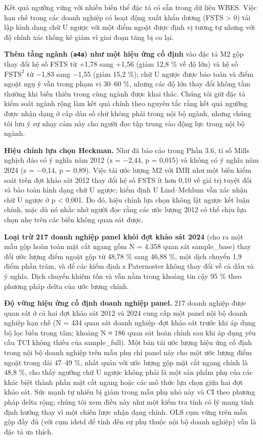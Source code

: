 \documentclass[12pt,a4paper]{article}
\begin{document}
Kết quả ngưỡng vững với nhiều biến thể đặc tả có sẵn trong dữ liệu WBES.
Việc hạn chế trong các doanh nghiệp có hoạt động xuất khẩu dương (FSTS
\textgreater{} 0) tái lập hình dạng chữ U ngược với một điểm ngoặt được
định vị tương tự nhưng với độ chính xác thống kê giảm vì giai đoạn tăng
bị co lại.

\textbf{Thêm tầng ngành (\texttt{a4a}) như một hiệu ứng cố định} vào đặc
tả M2 gộp thay đổi hệ số FSTS từ +1,78 sang +1,56 (giảm 12,8 \% về độ
lớn) và hệ số \(\mathrm{FSTS}^2\) từ −1,83 sang −1,55 (giảm 15,2 \%);
chữ U ngược được bảo toàn và điểm ngoặt ngụ ý vẫn trong phạm vi 30--60
\%, nhưng các độ lớn thay đổi không tầm thường khi biến thiên trong cùng
ngành được khai thác. Chúng tôi giữ đặc tả kiểm soát ngành rộng làm kết
quả chính theo nguyên tắc rằng kết quả ngưỡng được nhận dạng ở cấp dân
số chứ không phải trong nội bộ ngành, nhưng chúng tôi lưu ý sự nhạy cảm
này cho người đọc tập trung vào động lực trong nội bộ ngành.

\textbf{Hiệu chỉnh lựa chọn Heckman.} Như đã báo cáo trong Phần 3.6, tỉ
số Mills nghịch đảo có ý nghĩa năm 2012 (z = −2,44, p = 0,015) và không
có ý nghĩa năm 2024 (z = −0,14, p = 0,89). Việc tái ước lượng M2 với IMR
như một biến kiểm soát trên đợt khảo sát 2012 thay đổi hệ số FSTS ít hơn
0,10 về giá trị tuyệt đối và bảo toàn hình dạng chữ U ngược; kiểm định U
Lind--Mehlum vẫn xác nhận chữ U ngược ở p \textless{} 0,001. Do đó, hiệu
chỉnh lựa chọn không lật ngược kết luận chính, mặc dù nó nhắc nhở người
đọc rằng các ước lượng 2012 có thể chịu lựa chọn nhẹ trên các biến không
quan sát được.

\textbf{Loại trừ 217 doanh nghiệp panel khỏi đợt khảo sát 2024} (cho ra
một mẫu gộp hoàn toàn mặt cắt ngang gồm N = 4.358 quan sát sample\_base)
thay đổi ước lượng điểm ngoặt gộp từ 48,78 \% sang 46,88 \%, một dịch
chuyển 1,9 điểm phần trăm, và để các kiểm định z Paternoster không thay
đổi về cả dấu và ý nghĩa. Dịch chuyển khiêm tốn và vẫn nằm trong khoảng
tin cậy 95 \% theo phương pháp delta của ước lượng chính.

\textbf{Độ vững hiệu ứng cố định doanh nghiệp panel.} 217 doanh nghiệp
được quan sát ở cả hai đợt khảo sát 2012 và 2024 cung cấp một panel nội
bộ doanh nghiệp hạn chế (N = 434 quan sát doanh nghiệp--đợt khảo sát
trước khi áp dụng bộ lọc biến trọng tâm; khoảng N ≈ 186 quan sát hoàn
chỉnh sau khi áp dụng yêu cầu TCI không thiếu của sample\_full). Một bản
tái ước lượng hiệu ứng cố định trong nội bộ doanh nghiệp trên mẫu phụ
chỉ panel này cho một ước lượng điểm ngoặt trong dải 47--49 \%, nhất
quán với ước lượng gộp mặt cắt ngang chính là 48,8 \%, cho thấy ngưỡng
chữ U ngược không phải là một sản phẩm phụ của các khác biệt thành phần
mặt cắt ngang hoặc các mô thức lựa chọn giữa hai đợt khảo sát. Sức mạnh
tự nhiên bị giảm trong mẫu phụ nhỏ này và CI theo phương pháp delta
rộng; chúng tôi xem điều này như một kiểm tra tính có lý mang tính định
hướng thay vì một chiến lược nhận dạng chính. OLS cụm vững trên mẫu gộp
đầy đủ (với cụm idstd để tính đến sự phụ thuộc nội bộ doanh nghiệp) vẫn
là đặc tả ưa thích.
\end{document}
